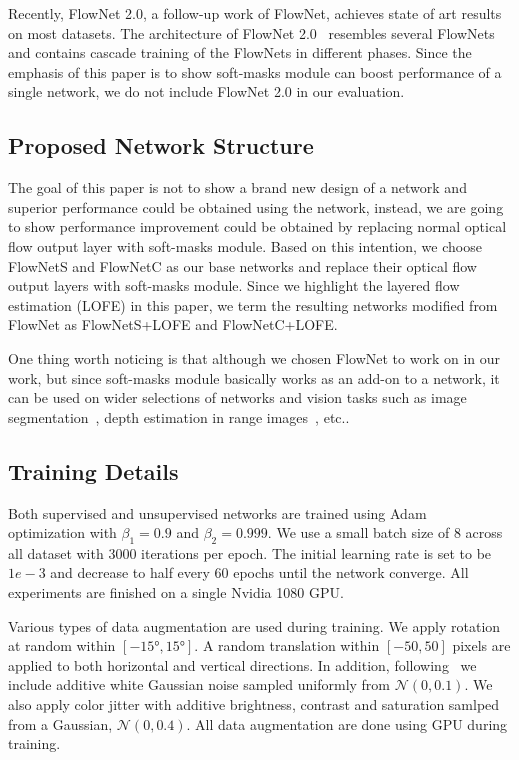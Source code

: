 \documentclass[10pt,twocolumn,letterpaper]{article}
\begin{document}
Recently, FlowNet 2.0, a follow-up work of FlowNet, achieves state of art results on most datasets. The architecture of FlowNet 2.0~\cite{Ilg_2017_CVPR} resembles several FlowNets and contains cascade training of the FlowNets in different phases. Since the emphasis of this paper is to show soft-masks module can boost performance of a single network, we do not include FlowNet 2.0 in our evaluation. 

\subsection{Proposed Network Structure}
The goal of this paper is not to show a brand new design of a network and superior performance could be obtained using the network, instead, we are going to show performance improvement could be obtained by replacing normal optical flow output layer with soft-masks module. Based on this intention, we choose FlowNetS and FlowNetC as our base networks and replace their optical flow output layers with soft-masks module. Since we highlight the layered flow estimation (LOFE) in this paper, we term the resulting networks modified from FlowNet as FlowNetS+LOFE and FlowNetC+LOFE. 

One thing worth noticing is that although we chosen FlowNet to work on in our work, but since soft-masks module basically works as an add-on to a network, it can be used on wider selections of networks and vision tasks such as image segmentation~\cite{long2015fully}\cite{noh2015learning}, depth estimation in range images~\cite{eigen2014depth}\cite{eigen2015predicting}, etc..

\subsection{Training Details}
Both supervised and unsupervised networks are trained using Adam~\cite{kingma2014adam} optimization with $\beta_1=0.9$ and $\beta_2=0.999$. We use a small batch size of 8 across all dataset with 3000 iterations per epoch. The initial learning rate is set to be $1e-3$ and decrease to half every 60 epochs until the network converge. All experiments are finished on a single Nvidia 1080 GPU.

Various types of data augmentation are used during training. We apply rotation at random within $[\ang{-15}, \ang{15}]$. A random translation within $[-50, 50]$ pixels are applied to both horizontal and vertical directions. In addition, following~\cite{Ranjan_2017_CVPR} we include additive white Gaussian noise sampled uniformly from $\mathcal{N}(0, 0.1)$. We also apply color jitter with additive brightness, contrast and saturation samlped from a Gaussian, $\mathcal{N}(0, 0.4)$. All data augmentation are done using GPU during training.
\end{document}

